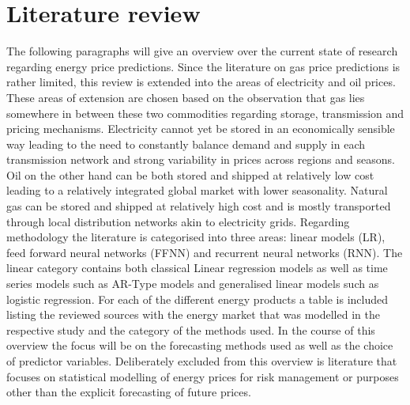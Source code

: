 \chapter{Literature review} \label{sec:Literature}
The following paragraphs will give an overview over the current state of research regarding energy price predictions. Since the literature on gas price predictions is rather limited, this review is extended into the areas of electricity and oil prices. 
These areas of extension are chosen based on the observation that gas lies somewhere in between these two commodities regarding storage, transmission and pricing mechanisms. Electricity cannot yet be stored in an economically sensible way leading to the need to constantly balance demand and supply in each transmission network and strong variability in prices across regions and seasons. Oil on the other hand can be both stored and shipped at relatively low cost leading to a relatively integrated global market with lower seasonality. Natural gas can be stored and shipped at relatively high cost and is mostly transported through local distribution networks akin to electricity grids. Regarding methodology the literature is categorised into three areas: linear models (LR), feed forward neural networks (FFNN) and recurrent neural networks (RNN). The linear category contains both classical Linear regression models as well as time series models such as AR-Type models and generalised linear models such as logistic regression. For each of the different energy products a table is included listing the reviewed sources with the energy market that was modelled in the respective study and the category of the methods used. In the course of this overview the focus will be on the forecasting methods used as well as the choice of predictor variables. Deliberately excluded from this overview is literature that focuses on statistical modelling of energy prices for risk management or purposes other than the explicit forecasting of future prices.

